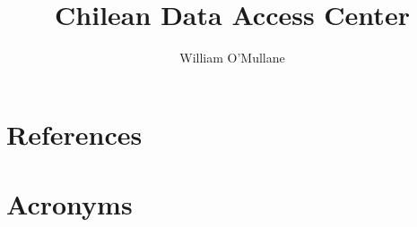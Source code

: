 \documentclass[lsstdraft,DM]{lsstdoc}
\title[Chilean DAC ]{ Chilean Data Access Center }
\author   {William O'Mullane}
\begin{document}
%
%
\maketitle

\renewcommand{\thepage}{\arabic{page}}%

\setcounter{page}{1}%
%
%


\section{References\label{sect:references}}
\renewcommand{\refname}{}


\section{Acronyms}
\end{document}
